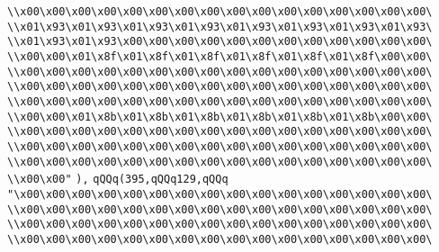 \verb|\\x00\x00\x00\x00\x00\x00\x00\x00\x00\x00\x00\x00\x00\x00\x00\x00\|\newline
\verb|\\x01\x93\x01\x93\x01\x93\x01\x93\x01\x93\x01\x93\x01\x93\x01\x93\|\newline
\verb|\\x01\x93\x01\x93\x00\x00\x00\x00\x00\x00\x00\x00\x00\x00\x00\x00\|\newline
\verb|\\x00\x00\x01\x8f\x01\x8f\x01\x8f\x01\x8f\x01\x8f\x01\x8f\x00\x00\|\newline
\verb|\\x00\x00\x00\x00\x00\x00\x00\x00\x00\x00\x00\x00\x00\x00\x00\x00\|\newline
\verb|\\x00\x00\x00\x00\x00\x00\x00\x00\x00\x00\x00\x00\x00\x00\x00\x00\|\newline
\verb|\\x00\x00\x00\x00\x00\x00\x00\x00\x00\x00\x00\x00\x00\x00\x00\x00\|\newline
\verb|\\x00\x00\x01\x8b\x01\x8b\x01\x8b\x01\x8b\x01\x8b\x01\x8b\x00\x00\|\newline
\verb|\\x00\x00\x00\x00\x00\x00\x00\x00\x00\x00\x00\x00\x00\x00\x00\x00\|\newline
\verb|\\x00\x00\x00\x00\x00\x00\x00\x00\x00\x00\x00\x00\x00\x00\x00\x00\|\newline
\verb|\\x00\x00\x00\x00\x00\x00\x00\x00\x00\x00\x00\x00\x00\x00\x00\x00\|\newline
\verb|\\x00\x00"|\newline
\verb|),|\newline
\verb|qQQq(395,qQQq129,qQQq|\newline
\verb|"\x00\x00\x00\x00\x00\x00\x00\x00\x00\x00\x00\x00\x00\x00\x00\x00\|\newline
\verb|\\x00\x00\x00\x00\x00\x00\x00\x00\x00\x00\x00\x00\x00\x00\x00\x00\|\newline
\verb|\\x00\x00\x00\x00\x00\x00\x00\x00\x00\x00\x00\x00\x00\x00\x00\x00\|\newline
\verb|\\x00\x00\x00\x00\x00\x00\x00\x00\x00\x00\x00\x00\x00\x00\x00\x00\|\newline
